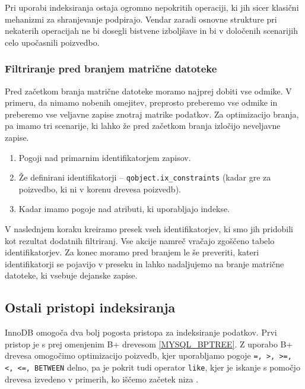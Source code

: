 \documentclass[a4paper,12pt,openright]{book}
\begin{document}
        \noindent
        Pri uporabi indeksiranja ostaja ogromno nepokritih operaciji, ki jih sicer klasični mehanizmi za shranjevanje podpirajo. Vendar zaradi osnovne strukture pri nekaterih operacijah ne bi dosegli bistvene izboljšave in bi v določenih scenarijih celo upočasnili poizvedbo.

        \subsubsection{Filtriranje pred branjem matrične datoteke}

        Pred začetkom branja matrične datoteke moramo najprej dobiti vse odmike. V primeru, da nimamo nobenih omejitev, preprosto preberemo vse odmike in preberemo vse veljavne zapise znotraj matrike podatkov. Za optimizacijo branja, pa imamo tri scenarije, ki lahko že pred začetkom branja izločijo neveljavne zapise.

        \begin{enumerate}
            \item Pogoji nad primarnim identifikatorjem zapisov.
            \item Že definirani identifikatorji – {\tt qobject.ix\_constraints} (kadar gre za poizvedbo, ki ni v korenu drevesa poizvedb).
            \item Kadar imamo pogoje nad atributi, ki uporabljajo indekse.
        \end{enumerate}

        \noindent
        V naslednjem koraku kreiramo presek vseh identifikatorjev, ki smo jih pridobili kot rezultat dodatnih filtriranj. Vse akcije namreč vračajo zgoščeno tabelo identifikatorjev. Za konec moramo pred branjem le še preveriti, kateri identifikatorji se pojavijo v preseku in lahko nadaljujemo na branje matrične datoteke, ki vsebuje dejanske zapise.

        \subsection{Ostali pristopi indeksiranja}

        InnoDB omogoča dva bolj pogosta pristopa za indeksiranje podatkov. Prvi pristop je s prej omenjenim B+ drevesom \ref{MYSQL_BPTREE}. Z uporabo B+ drevesa omogočimo optimizacijo poizvedb, kjer uporabljamo pogoje {\tt =, >, >=, <, <=, BETWEEN} delno, pa je pokrit tudi operator {\tt like}, kjer je iskanje s pomočjo drevesa izvedeno v primerih, ko iščemo začetek niza \cite{TREE_HASH_MYSQL}.
\end{document}
